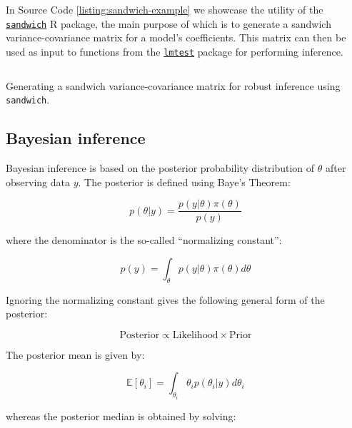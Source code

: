 \documentclass{report}
\begin{document}
In Source Code \ref{listing:sandwich-example} we showcase the utility of the \href{https://cran.r-project.org/web/packages/sandwich/index.html}{\texttt{sandwich}} R package, the main purpose of which is to generate a sandwich variance-covariance matrix for a model's coefficients. This matrix can then be used as input to functions from the \href{https://cran.r-project.org/web/packages/lmtest/index.html}{\texttt{lmtest}} package for performing inference. 

\begin{listing}[h!]
\inputminted{r}{Example-Code/sandwich_linear_regression.R}
\caption{Generating a sandwich variance-covariance matrix for robust inference using \texttt{sandwich}.}
\label{listing:sandwich-example}
\end{listing}

\subsection{Bayesian inference}

Bayesian inference is based on the posterior probability distribution of $\theta$ after observing data $y$. The posterior is defined using Baye's Theorem:

\begin{equation}\label{eq:ols-bayes-posterior}
    p(\theta | y) = \frac{p(y | \theta) \pi(\theta)}{p(y)}
\end{equation}

where the denominator is the so-called ``normalizing constant'':

\begin{equation}\label{eq:ols-bayes-norm-constant}
    p(y) = \int_\theta p(y | \theta) \pi(\theta) d\theta
\end{equation}

Ignoring the normalizing constant gives the following general form of the posterior:

\begin{equation}\label{eq:ols-bayes-general-concept}
    \text{Posterior} \propto \text{Likelihood} \times \text{Prior}
\end{equation}

The posterior mean is given by:

\begin{equation}\label{eq:ols-bayes-posterior-mean}
    \mathbb{E}[\theta_i] = \int_{\theta_i} \theta_i p(\theta_i | y) d\theta_i
\end{equation}

whereas the posterior median is obtained by solving:
\end{document}
